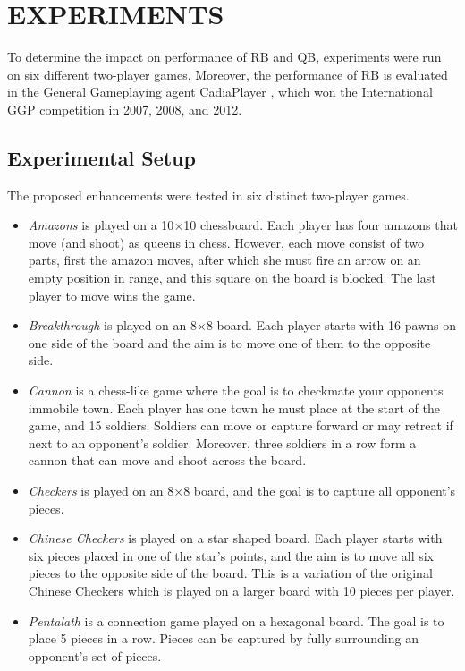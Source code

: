 \documentclass{ecai2014}
\begin{document}
\section{EXPERIMENTS}
\label{sec:experiments}
To determine the impact on performance of RB and QB, experiments were run on six different two-player games. Moreover, the performance of RB is evaluated in the General Gameplaying agent {\sc CadiaPlayer} \cite{bjornsson2009cadiaplayer}, which won the International GGP competition in 2007, 2008, and 2012.

\subsection{Experimental Setup}
\label{subsec:expsetup}
The proposed enhancements were tested in six distinct two-player games.
\begin{itemize}
\item \emph{Amazons} is played on a 10$\times$10 chessboard. Each player has four amazons that move (and shoot) as queens in chess. However, each move consist of two parts, first the amazon moves, after which she must fire an arrow on an empty position in range, and this square on the board is blocked. The last player to move wins the game.
\item \emph{Breakthrough} is played on an 8$\times$8 board. Each player starts with 16 pawns on one side of the board and the aim is to move one of them to the opposite side.
\item \emph{Cannon} is a chess-like game where the goal is to checkmate your opponents immobile town. Each player has one town he must place at the start of the game, and 15 soldiers. Soldiers can move or capture forward or may retreat if next to an opponent's soldier. Moreover, three soldiers in a row form a cannon that can move and shoot across the board.
\item \emph{Checkers} is played on an 8$\times$8 board, and the goal is to capture all opponent's pieces.
\item \emph{Chinese Checkers} is played on a star shaped board. Each player starts with six pieces placed in one of the star's points, and the aim is to move all six pieces to the opposite side of the board. This is a variation of the original Chinese Checkers which is played on a larger board with 10 pieces per player.
\item \emph{Pentalath} is a connection game played on a hexagonal board. The goal is to place 5 pieces in a row. Pieces can be captured by fully surrounding an opponent's set of pieces.
\end{itemize}
\end{document}
